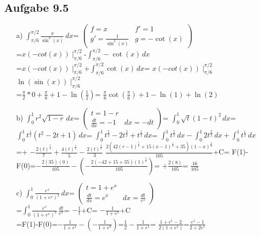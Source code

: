 \documentclass{standalone}
\begin{document}
\subsection {Aufgabe 9.5}
\begin{itemize}
    \item[a)]
    $\int_{\pi/6}^{\pi/2}\frac{x}{\sin^2(x)}\,dx$=
    $\begin{pmatrix}
    f = x & f' = 1 \\
    g' = \frac{1}{\sin^2(x)} & g = -\cot(x)
    \end{pmatrix}$\\
    =$x(- cot(x))\mid^{\pi/2}_{\pi/6}$-$\int_{\pi/6}^{\pi/2}-\cot(x) \,dx$\\
    =$x(- cot(x))\mid^{\pi/2}_{\pi/6}$+$\int_{\pi/6}^{\pi/2}\cot(x) \,dx$=
    $x(- cot(x))\mid^{\pi/2}_{\pi/6}$$\ln(\sin(x))\mid^{\pi/2}_{\pi/6}$\\
    =$\frac{\pi}{2}*0+\frac{\pi}{6}+1-\ln(\frac{1}{2})$=
    $\frac{\pi}{6}\cot(\frac{\pi}{6})+1-\ln(1)+\ln(2)$

    \item[b)]
    $\int_{0}^{1}r^2\sqrt{1-r} \,dx$=
    $\begin{pmatrix}
    t = 1-r & \\
        \frac{dt}{dx} = -1 & dx = -dt
        \end{pmatrix}$=
    $\int_{0}^{1}\sqrt{t}(1-t)^2 \,dx$=
    $\int_{0}^{1}t^{\frac{1}{2}}(t^2-2t+1) \,dx$=
    $\int_{0}^{1}t^{\frac{5}{2}}-2t^{\frac{3}{2}}+t^{\frac{1}{2}} \,dx$=
    $\int_{0}^{1}t^{\frac{5}{2}}\,dx-\int_{0}^{1}2t^{\frac{3}{2}}\,dx+\int_{0}^{1}t^{\frac{1}{2}} \,dx$=+
    $-\frac{2(t)^{\frac{7}{2}}}{7}+\frac{4(t)^{\frac{5}{2}}}{5}-\frac{2(t)^{\frac{3}{2}}}{3}$
    $\frac{2(42(r-1)^{\frac{7}{2}}+15(x-1)^{\frac{5}{2}}+35)(1-x)^{\frac{3}{2}}}{105}$+C=
    F(1)-F(0)=$-\frac{2(35)(0)}{105}-(-\frac{2(-42+15+35)(1)^{\frac{3}{2}}}{105})$=
    $+\frac{2(8)}{105}$= $\frac{16}{105}$
    \item[c)]
    $\int_{0}^{1}\frac{e^x}{(1+e^x)^2} \,dx$=
    $\begin{pmatrix}
        t = 1+e^x &  \\
        \frac{dt}{dx} = e^x & dx = \frac{dt}{e^x}
    \end{pmatrix}$\\
    =$\int_{0}^{1}\frac{e^x}{(1+e^x)^2} \,\frac{dt}{e^x}$=
    $-\frac{1}{t}$+C=
    $-\frac{1}{1+e^x}$+C\\
    =F(1)-F(0)=$-\frac{1}{1+e^1}-(-\frac{1}{1+e^0})$=$\frac{1}{2}-\frac{1}{1+e^1}$=
    $\frac{1+e^1-2}{2(1+e^1)}$=$\frac{e^1-1}{2+2e^1}$


\end{itemize}
\end{document}
